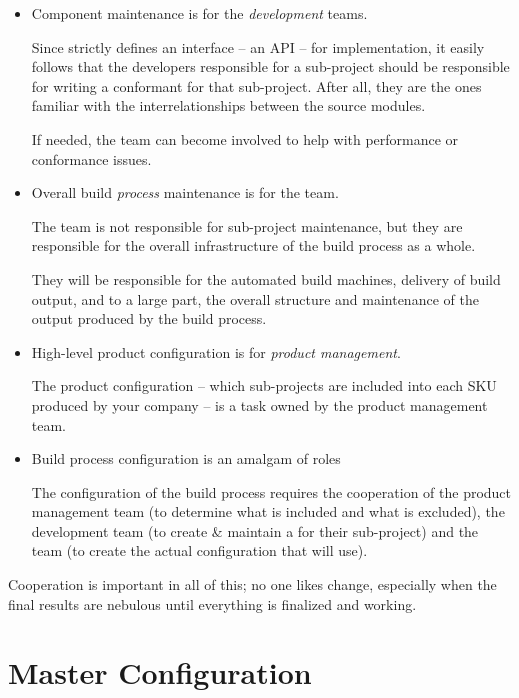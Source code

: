 \begin{itemize}
  \item Component \makefile maintenance is for the \emph{development} teams.

    Since \lmsbw strictly defines an interface -- an API -- for
    \makefile implementation, it easily follows that the developers
    responsible for a sub-project should be responsible for writing a
    conformant \makefile for that sub-project.  After all, they are
    the ones familiar with the interrelationships between the source
    modules.

    If needed, the \bni team can become involved to help with
    performance or conformance issues.

  \item Overall build \emph{process} maintenance is for the
    \emph{\bni} team.

    The \bni team is not responsible for sub-project \makefile
    maintenance, but they are responsible for the overall
    infrastructure of the build process as a whole.

    They will be responsible for the automated build machines,
    delivery of build output, and to a large part, the overall
    structure and maintenance of the output produced by the build
    process.

  \item High-level product configuration is for \emph{product
    management}.

    The product configuration -- which sub-projects are included into
    each SKU produced by your company -- is a task owned by the
    product management team.

  \item Build process configuration is an amalgam of roles

    The configuration of the build process requires the cooperation of
    the product management team (to determine what is included and
    what is excluded), the development team (to create \& maintain a
    \makefile for their sub-project) and the \bni team (to create the
    actual configuration that \lmsbw will use).
\end{itemize}

Cooperation is important in all of this; no one likes change,
especially when the final results are nebulous until everything is
finalized and working.

\section{Master Configuration}\label{wrap:master-configuration}

